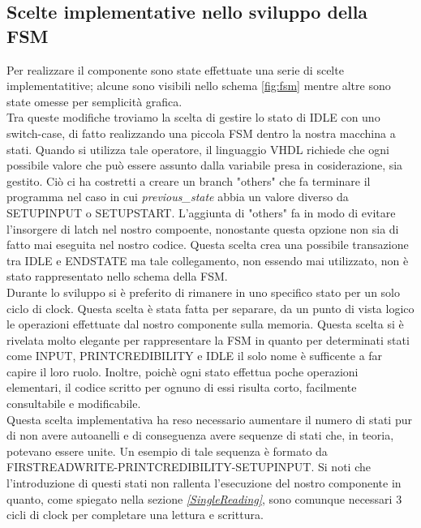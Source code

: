 \documentclass[12pt]{article}
\begin{document}
\subsection{Scelte implementative nello sviluppo della FSM}
Per realizzare il componente sono state effettuate una serie di scelte implementatitive; alcune sono visibili nello schema \ref{fig:fsm} mentre altre sono state omesse per semplicità grafica.\\
Tra queste modifiche troviamo la scelta di gestire lo stato di IDLE con uno switch-case, di fatto realizzando una piccola FSM dentro la nostra macchina a stati. Quando si utilizza tale operatore, il linguaggio VHDL richiede che ogni possibile valore che può essere assunto dalla variabile presa in cosiderazione, sia gestito. Ciò ci ha costretti a creare un branch "others" che fa terminare il programma nel caso in cui \textit{previous\_state} abbia un valore diverso da SETUPINPUT o SETUPSTART. L'aggiunta di "others" fa in modo di evitare l'insorgere di latch nel nostro compoente, nonostante questa opzione non sia di fatto mai eseguita nel nostro codice. Questa scelta crea una possibile transazione tra IDLE e ENDSTATE ma tale collegamento, non essendo mai utilizzato, non è stato rappresentato nello schema della FSM.\\

Durante lo sviluppo si è preferito di rimanere in uno specifico stato per un solo ciclo di clock. Questa scelta è stata fatta per separare, da un punto di vista logico le operazioni effettuate dal nostro componente sulla memoria. Questa scelta si è rivelata molto elegante per rappresentare la FSM in quanto per determinati stati come INPUT, PRINTCREDIBILITY e IDLE il solo nome è sufficente a far capire il loro ruolo. Inoltre, poichè ogni stato effettua poche operazioni elementari, il codice scritto per ognuno di essi risulta corto, facilmente consultabile e modificabile.\\

Questa scelta implementativa ha reso necessario aumentare il numero di stati pur di non avere autoanelli e di conseguenza avere sequenze di stati che, in teoria, potevano essere unite. Un esempio di tale sequenza è formato da FIRSTREADWRITE-PRINTCREDIBILITY-SETUPINPUT. 
Si noti che l'introduzione di questi stati non rallenta l'esecuzione del nostro componente in quanto, come spiegato nella sezione \textit{\ref{SingleReading}}, sono comunque necessari 3 cicli di clock per completare una lettura e scrittura.\\
\end{document}
